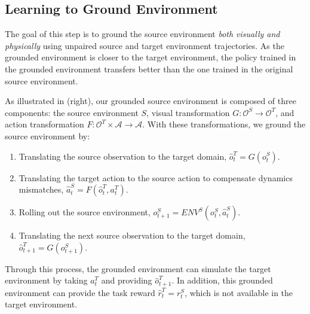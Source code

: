 \subsection{Learning to Ground Environment}
\label{sec:grounded_environment}

The goal of this step is to ground the source environment \textit{both visually and physically} using unpaired source and target environment trajectories. 
As the grounded environment is closer to the target environment, the policy trained in the grounded environment transfers better than the one trained in the original source environment.

As illustrated in  (right), our grounded source environment is composed of three components: the source environment $S$, visual transformation $G: \mathcal{O}^S \rightarrow \mathcal{O}^T$, and action transformation $F: \mathcal{O}^T \times \mathcal{A} \rightarrow \mathcal{A}$. 
With these transformations, we ground the source environment by:
\begin{enumerate}[label=(\arabic*)]
\item Translating the source observation to the target domain, $\hat{o}_t^T = G(o_t^S)$.
\item Translating the target action to the source action to compensate dynamics mismatches, $\hat{a}_t^S = F(\hat{o}_t^T, a_t^T)$.
\item Rolling out the source environment, $o_{t+1}^S = ENV^S(o_t^S, \hat{a}_t^S)$. 
\item Translating the next source observation to the target domain, $\hat{o}_{t+1}^T = G(o_{t+1}^S)$. 
\end{enumerate}
Through this process, the grounded environment can simulate the target environment by taking $a_t^T$ and providing $\hat{o}_{t+1}^T$. In addition, this grounded environment can provide the task reward $\hat{r}_t^T = r_t^S$, which is not available in the target environment.

